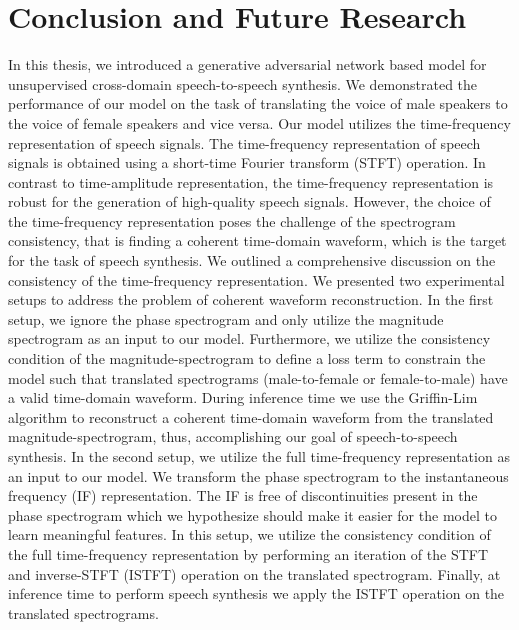 \chapter{Conclusion and Future Research}
\label{ch:conclusion}
In this thesis, we introduced a generative adversarial network based model for unsupervised cross-domain speech-to-speech synthesis. We demonstrated the performance of our model on the task of translating the voice of male speakers to the voice of female speakers and vice versa. Our model utilizes the time-frequency representation of speech signals. The time-frequency representation of speech signals is obtained using a short-time Fourier transform (STFT) operation. In contrast to time-amplitude representation, the time-frequency representation is robust for the generation of high-quality speech signals. However, the choice of the time-frequency representation poses the challenge of the spectrogram consistency, that is finding a coherent time-domain waveform, which is the target for the task of speech synthesis. We outlined a comprehensive discussion on the consistency of the time-frequency representation. We presented two experimental setups to address the problem of coherent waveform reconstruction. In the first setup, we ignore the phase spectrogram and only utilize the magnitude spectrogram as an input to our model. Furthermore, we utilize the consistency condition of the magnitude-spectrogram to define a loss term to constrain the model such that translated spectrograms (male-to-female or female-to-male) have a valid time-domain waveform. During inference time we use the Griffin-Lim algorithm to reconstruct a coherent time-domain waveform from the translated magnitude-spectrogram, thus, accomplishing our goal of speech-to-speech synthesis. In the second setup, we utilize the full time-frequency representation as an input to our model. We transform the phase spectrogram to the instantaneous frequency (IF) representation. The IF is free of discontinuities present in the phase spectrogram which we hypothesize should make it easier for the model to learn meaningful features. In this setup, we utilize the consistency condition of the full time-frequency representation by performing an iteration of the STFT and inverse-STFT (ISTFT) operation on the translated spectrogram. Finally, at inference time to perform speech synthesis we apply the ISTFT operation on the translated spectrograms.

